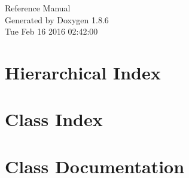 \documentclass[twoside]{book}
\newcommand{\clearemptydoublepage}{%
  \newpage{\pagestyle{empty}\cleardoublepage}%
}
\begin{document}
\hypersetup{pageanchor=false}
\begin{titlepage}
\vspace*{7cm}
\begin{center}%
{\Large Reference Manual}\\
\vspace*{1cm}
{\large Generated by Doxygen 1.8.6}\\
\vspace*{0.5cm}
{\small Tue Feb 16 2016 02:42:00}\\
\end{center}
\end{titlepage}
\clearemptydoublepage
\tableofcontents
\clearemptydoublepage
{}
\hypersetup{pageanchor=true}

\chapter{Hierarchical Index}

\chapter{Class Index}

\chapter{Class Documentation}


























\newpage
{}
{}
\printindex
\end{document}
